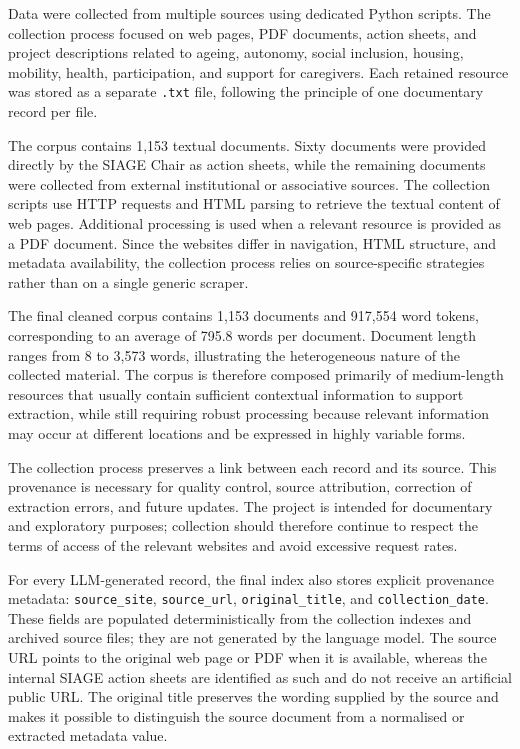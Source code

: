 Data were collected from multiple sources using dedicated Python scripts. The
collection process focused on web pages, PDF documents, action sheets, and
project descriptions related to ageing, autonomy, social inclusion, housing,
mobility, health, participation, and support for caregivers. Each retained
resource was stored as a separate \texttt{.txt} file, following the principle
of one documentary record per file.

The corpus contains 1,153 textual documents. Sixty documents were provided
directly by the SIAGE Chair as action sheets, while the remaining documents were
collected from external institutional or associative sources. The collection
scripts use HTTP requests and HTML parsing to retrieve the textual content of
web pages. Additional processing is used when a relevant resource is provided
as a PDF document. Since the websites differ in navigation, HTML structure, and
metadata availability, the collection process relies on source-specific
strategies rather than on a single generic scraper.

The final cleaned corpus contains 1,153 documents and 917,554 word tokens,
corresponding to an average of 795.8 words per document. Document length ranges
from 8 to 3,573 words, illustrating the heterogeneous nature of the collected
material. The corpus is therefore composed primarily of medium-length resources
that usually contain sufficient contextual information to support extraction,
while still requiring robust processing because relevant information may occur
at different locations and be expressed in highly variable forms.

The collection process preserves a link between each record and its source.
This provenance is necessary for quality control, source attribution, correction
of extraction errors, and future updates. The project is intended for
documentary and exploratory purposes; collection should therefore continue to
respect the terms of access of the relevant websites and avoid excessive request
rates.

For every LLM-generated record, the final index also stores explicit provenance
metadata: \texttt{source\_site}, \texttt{source\_url},
\texttt{original\_title}, and \texttt{collection\_date}. These fields are
populated deterministically from the collection indexes and archived source
files; they are not generated by the language model. The source URL points to
the original web page or PDF when it is available, whereas the internal SIAGE
action sheets are identified as such and do not receive an artificial public
URL. The original title preserves the wording supplied by the source and makes
it possible to distinguish the source document from a normalised or extracted
metadata value.

